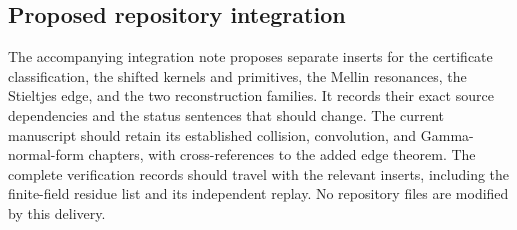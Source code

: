 \documentclass[11pt,letterpaper]{article}
\numberwithin{equation}{section}
\theoremstyle{definition}
\theoremstyle{remark}
\begin{document}
\subsection{Proposed repository integration}

The accompanying integration note proposes separate inserts for the
certificate classification, the shifted kernels and primitives, the
Mellin resonances, the Stieltjes edge, and the two reconstruction
families. It records their exact source dependencies and the status
sentences that should change. The current manuscript should retain
its established collision, convolution, and Gamma-normal-form
chapters, with cross-references to the added edge theorem. The
complete verification records should travel with the relevant
inserts, including the finite-field residue list and its independent
replay. No repository files are modified by this delivery.

\end{document}
